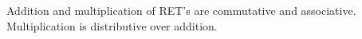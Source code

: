 Addition and multiplication of RET's are commutative and associative. Multiplication is distributive over addition.